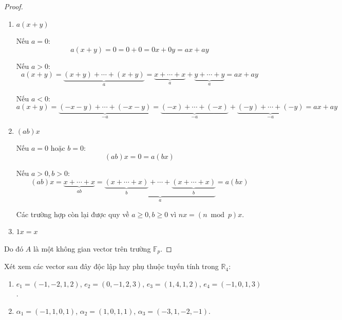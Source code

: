 \begin{proof}
\begin{enumerate}[label= (V\arabic*)]
              Nếu $a > 0, b < 0$ và $a + b < 0$
              \[ (a + b)x = \underbrace{(-x) + \cdots + (-x)}_{-a-b} = \underbrace{x + \cdots + x}_{a} + \underbrace{(-x) + \cdots + (-x)}_{b} = ax + bx \]
              
              Nếu $a > 0, b < 0$ và $a + b = 0$
              \[ (a + b)x = 0 = \underbrace{(x + \cdots + x)}_{a} + \underbrace{(-x) + \cdots + (-x)}_{-b} = ax + bx \]
              
              Trường hợp $a < 0, b > 0$ được chứng minh tương tự.
        \item $a(x + y)$
              
              Nếu $a = 0$:
              \[ a(x + y) = 0 = 0 + 0 = 0x + 0y = ax + ay \]
              
              Nếu $a > 0$:
              \[ a(x + y) = \underbrace{(x+y)+\cdots+(x+y)}_{a} = \underbrace{x + \cdots + x}_{a} + \underbrace{y + \cdots + y}_{a} = ax + ay \]
              
              Nếu $a < 0$:
              \[ a(x + y) = \underbrace{(-x-y)+\cdots+(-x-y)}_{-a} = \underbrace{(-x) + \cdots + (-x)}_{-a} + \underbrace{(-y) + \cdots + (-y)}_{-a} = ax + ay \]
        \item $(ab)x$
              
              Nếu $a = 0$ hoặc $b = 0$:
              \[ (ab)x = 0 = a(bx) \]
              
              Nếu $a > 0, b > 0$:
              \[ (ab)x = \underbrace{x + \cdots + x}_{ab} = \underbrace{\underbrace{(x + \cdots + x)}_{b} + \cdots + \underbrace{(x + \cdots + x)}_{b}}_{a} = a(bx) \]
              
              Các trường hợp còn lại được quy về $a\ge 0, b\ge 0$ vì $nx = (n\bmod p)x$.
        \item $1x = x$
    \end{enumerate}
    
    Do đó $A$ là một không gian vector trên trường $\mathbb{F}_{p}$.
\end{proof}

\begin{exercise}
    Xét xem các vector sau đây độc lập hay phụ thuộc tuyến tính trong $\mathbb{R}_{4}$:
    \begin{enumerate}[label = (\alph*)]
        \item $e_{1} = (-1, -2, 1, 2)$, $e_{2} = (0, -1, 2, 3)$, $e_{3} = (1, 4, 1, 2)$, $e_{4} = (-1, 0, 1, 3)$.
        \item $\alpha_{1} = (-1, 1, 0, 1)$, $\alpha_{2} = (1, 0, 1, 1)$, $\alpha_{3} = (-3, 1, -2, -1)$.
    \end{enumerate}
\end{exercise}

